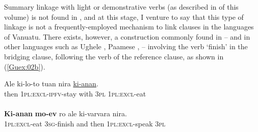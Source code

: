 \documentclass[output=paper]{LSP/langsci}
\begin{document}
Summary linkage with light or demonstrative verbs (as described in  of this volume) is not found in , and at this stage, I venture to say that this type of linkage is not a frequently-employed mechanism to link clauses in the  languages of Vanuatu. There exists, however, a construction commonly found in  -- and in other  languages such as Ughele \citep{Frostad2012}, Paamese \citep[][39]{crowley03},  \citep{hyslop01} -- involving the verb `finish' in the bridging clause, following the verb of the reference clause, as shown in (\ref{Guex:02b}).

\begin{exe}
\ex \label{Guex:02ab}
\begin{xlist}
\ex \label{Guex:02a}
\gll Ale    ki-lo-to       tuan   nira \underline{ki-anan}.\\
then  \textsc{1pl:excl-ipfv}-stay   with   \textsc{3pl}  \textsc{1pl:excl}-eat\\
\glt {}\\
\ex \label{Guex:02b}
\gll \textbf{Ki-anan}           \textbf{mo-ev} ro      ale  ki-varvara           nira.\\     	       
    \textsc{1pl:excl}-eat    \textsc{3sg}-finish   and   then  \textsc{1pl:excl-}speak     \textsc{3pl}\\
\glt {} 
\end{xlist}
\end{exe}
\end{document}
